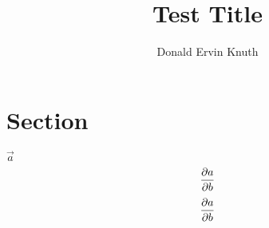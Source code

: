 \documentclass{article}
\title{Test Title}
\author{Donald Ervin Knuth}
\begin{document}
\maketitle
\tableofcontents
\section{Section}
\(\vec a\)
\begingroup
\begin{displaymath}
\frac{\partial a}{\partial b}
\end{displaymath}
\makepartialfractextstyle
\begin{displaymath}
\frac{\partial a}{\partial b}
\end{displaymath}
\endgroup
\end{document}
